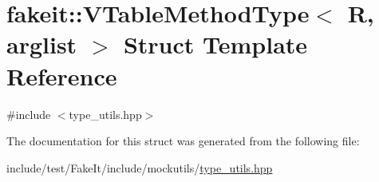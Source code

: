 \hypertarget{structfakeit_1_1VTableMethodType}{}\section{fakeit\+::V\+Table\+Method\+Type$<$ R, arglist $>$ Struct Template Reference}
\label{structfakeit_1_1VTableMethodType}


{\ttfamily \#include $<$type\+\_\+utils.\+hpp$>$}



The documentation for this struct was generated from the following file\+:\begin{DoxyCompactItemize}
\item 
include/test/\+Fake\+It/include/mockutils/\mbox{\hyperlink{type__utils_8hpp}{type\+\_\+utils.\+hpp}}\end{DoxyCompactItemize}
